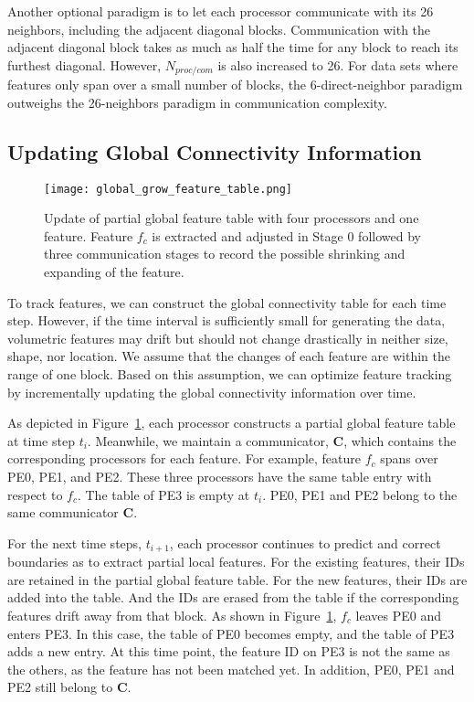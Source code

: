 Another optional paradigm is to let each processor communicate with its 26 neighbors, including the adjacent diagonal blocks. Communication with the adjacent diagonal block takes as much as half the time for any block to reach its furthest diagonal. However, $N_{proc/com}$  is also increased to 26. For data sets where features only span over a small number of blocks, the 6-direct-neighbor paradigm outweighs the 26-neighbors paradigm in communication complexity.

\subsection{Updating Global Connectivity Information}

\begin{figure}[t]
	\centering
	\texttt{[image: global\_grow\_feature\_table.png]}
	\caption{Update of partial global feature table with four processors and one feature. Feature $f_c$ is extracted and adjusted in Stage 0 followed by three communication stages to record the possible shrinking and expanding of the feature. }
	\label{fig:hybrid}
\end{figure}

To track features, we can construct the global connectivity table for each time step. However, if the time interval is sufficiently small for generating the data, volumetric features may drift but should not change drastically in neither size, shape, nor location. We assume that the changes of each feature are within the range of one block. Based on this assumption, we can optimize feature tracking by incrementally updating the global connectivity information over time.

As depicted in Figure~\ref{fig:hybrid}, each processor constructs a partial global feature table at time step $t_i$. Meanwhile, we maintain a communicator, $\textbf{C}$, which contains the corresponding processors for each feature. For example, feature $f_c$ spans over PE0, PE1, and PE2. These three processors have the same table entry with respect to $f_c$. The table of PE3 is empty at $t_i$. PE0, PE1 and PE2 belong to the same communicator $\textbf{C}$.

For the next time steps, $t_{i+1}$, each processor continues to predict and correct boundaries as to extract partial local features. For the existing features, their IDs are retained in the partial global feature table. For the new features, their IDs are added into the table. And the IDs are erased from the table if the corresponding features drift away from that block. As shown in Figure~\ref{fig:hybrid}, $f_c$ leaves PE0 and enters PE3. In this case, the table of PE0 becomes empty, and the table of PE3 adds a new entry. At this time point, the feature ID on PE3 is not the same as the others, as the feature has not been matched yet. In addition, PE0, PE1 and PE2 still belong to $\textbf{C}$. 

